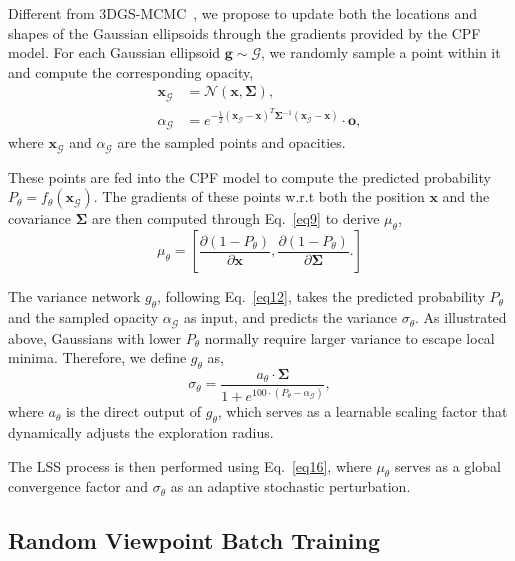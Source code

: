 \documentclass[lettersize,journal]{IEEEtran}
\begin{document}
Different from 3DGS-MCMC~\cite{mcmc}, we propose to update both the locations and shapes of the Gaussian ellipsoids through the gradients provided by the CPF model. For each Gaussian ellipsoid $\mathbf{g} \sim \mathcal{G}$, we randomly sample a point within it and compute the corresponding opacity, 
\begin{align}
    \mathbf{x}_{\mathcal{G}} &= \mathcal{N} \left( \mathbf{x}, \mathbf{\Sigma} \right) \label{eq22}, \\
    \alpha_{\mathcal{G}} &= e^{-\frac{1}{2} \left( \mathbf{x}_{\mathcal{G}} - \mathbf{x} \right)^{T} \mathbf{\Sigma}^{-1} \left( \mathbf{x}_{\mathcal{G}} - \mathbf{x} \right)} \cdot \mathbf{o}, \label{eq23}
\end{align}
where $\mathbf{x}_{\mathcal{G}}$ and $\alpha_{\mathcal{G}}$ are the sampled points and opacities. 

These points are fed into the CPF model to compute the predicted probability $P_{\theta}=f_{\theta}(\mathbf{x}_{\mathcal{G}})$. The gradients of these points w.r.t both the position $\mathbf{x}$ and the covariance $\mathbf{\Sigma}$ are then computed through Eq.~\ref{eq9} to derive $\mu_{\theta}$,
\begin{equation}
    \mu_{\theta} =  \left[ \frac{\partial \left( 1 - P_{\theta} \right)}{\partial \mathbf{x}}, \frac{\partial \left( 1 - P_{\theta} \right)}{\partial \mathbf{\Sigma}}. \right]
    \label{eq24}
\end{equation}

The variance network $g_{\theta}$, following Eq.~\ref{eq12}, takes the predicted probability $P_{\theta}$ and the sampled opacity $\alpha_{\mathcal{G}}$ as input, and predicts the variance $\sigma_{\theta}$. As illustrated above, Gaussians with lower $P_{\theta}$ normally require larger variance to escape local minima. Therefore, we define $g_{\theta}$ as, 
\begin{equation}
    \sigma_{\theta} = \frac{a_{\theta} \cdot \mathbf{\Sigma}}{1 + e^{100 \cdot ( P_{\theta} - \alpha_{\mathcal{G}} )}}, 
    \label{eq25}
\end{equation}
where $a_{\theta}$ is the direct output of $g_{\theta}$, which serves as a learnable scaling factor that dynamically adjusts the exploration radius. 

The LSS process is then performed using Eq.~\ref{eq16}, where $\mu_{\theta}$ serves as a global convergence factor and $\sigma_{\theta}$ as an adaptive stochastic perturbation.  

    
\subsection{Random Viewpoint Batch Training}
\end{document}
